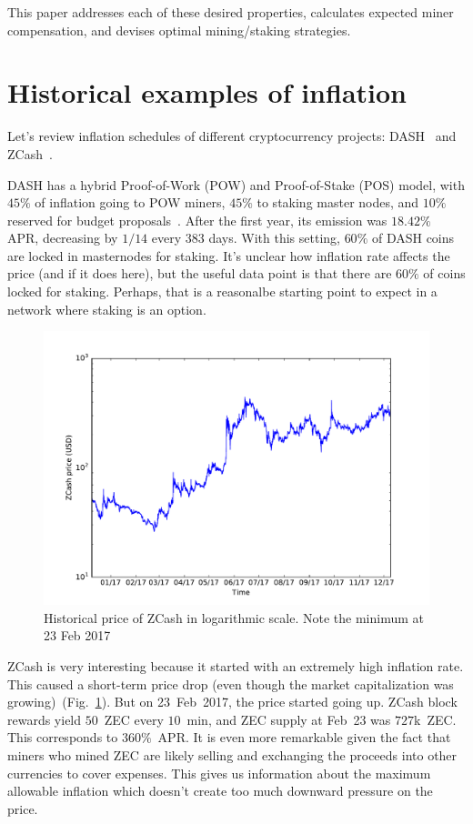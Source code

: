 \documentclass[longbibliography,nofootinbib,twocolumn]{revtex4-1}
\newcommand{\figref}[1]{Fig.~\ref{#1}}
\begin{document}
This paper addresses each of these desired properties, calculates expected miner compensation, and devises optimal mining/staking strategies.

\section{Historical examples of inflation}

Let's review inflation schedules of different cryptocurrency projects:
DASH~\cite{dash:whitepaper} and ZCash~\cite{zcash}.

DASH has a hybrid Proof-of-Work (POW) and Proof-of-Stake (POS) model,
with $45\%$ of inflation going to POW miners, $45\%$ to staking master nodes, and $10\%$ reserved for budget proposals~\cite{dash:emission}.
After the first year, its emission was $18.42\%$ APR, decreasing by $1/14$ every $383$ days.
With this setting, $60\%$ of DASH coins are locked in masternodes for staking.
It's unclear how inflation rate affects the price (and if it does here), but the useful data point is that there are $60\%$ of coins locked for staking.
Perhaps, that is a reasonalbe starting point to expect in a network where staking is an option.

\begin{figure}
    \includegraphics[width=\columnwidth]{pdf/zcash-price.pdf}
    \caption{Historical price of ZCash in logarithmic scale. Note the minimum at 23 Feb 2017}
    \label{fig:zec}
\end{figure}

ZCash is very interesting because it started with an extremely high inflation rate.
This caused a short-term price drop (even though the market capitalization was growing)~(\figref{fig:zec}).
But on 23~Feb~2017, the price started going up.
ZCash block rewards yield $50$~ZEC every $10$~min, and ZEC supply at Feb~23 was $727$k~ZEC.
This corresponds to $360\%$~APR.
It is even more remarkable given the fact that miners who mined ZEC are likely selling and exchanging the proceeds into other currencies to cover expenses.
This gives us information about the maximum allowable inflation which doesn't create too much downward pressure on the price.
\end{document}
